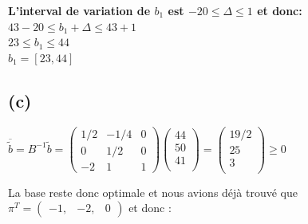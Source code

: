 \documentclass{article}
\begin{document}
\begin{center}
\textbf{L'interval de variation de $b_1$ est $-20\leq\Delta\leq 1$ et donc:}\\
$43-20\leq b_1+\Delta \leq 43 +1$\\
$23\leq b_1 \leq 44$\\
\textbf{$b_1=[23,44]$}  


\end{center}


\subsection*{(c)}
\begin{center}
$\overline{\tilde{b}}=B^{-1}\tilde{b}
	=
	\begin{pmatrix}
      1/2 & -1/4 & 0\\
      0   & 1/2  & 0\\ 
      -2  & 1    & 1
   	\end{pmatrix}
    \begin{pmatrix}
     44\\
     50\\
     41\\
   \end{pmatrix}
   =
   \begin{pmatrix}
     19/2\\ 
     25\\
     3\\
   \end{pmatrix}
   \geq 0$
   \\
   \vspace{5mm} %

   La base reste donc optimale et nous avions déjà trouvé que $\pi^T = \begin{pmatrix}
      -1,&-2,&0
   \end{pmatrix}$ et donc : 
   \\
   \vspace{5mm} %


\end{center}
\end{document}
